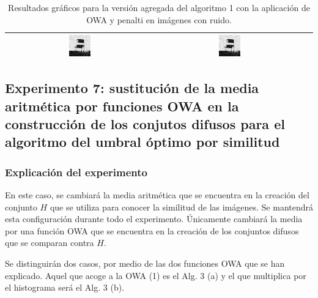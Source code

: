 \documentclass[main]{subfiles}
\begin{document}
\begin{table}
\begin{tabular}{c|c|c}
\includegraphics[width=0.15\textwidth]{img/res/e6/alg1agregadoowa2chairsp020.jpg} &
\includegraphics[width=0.15\textwidth]{img/res/e6/alg1agregadoowa3chairsp020.jpg} \\\hline
\end{tabular}
\caption{Resultados gráficos para la versión agregada del algoritmo 1 con la aplicación de OWA y penalti en imágenes con ruido.\label{tab:resultexp6imagenesruido}}
\end{table}


\subsection{Experimento 7: sustitución de la media aritmética por funciones OWA en la construcción de los conjutos difusos para el algoritmo del umbral óptimo por similitud}
\subsubsection{Explicación del experimento}
En este caso, se cambiará la media aritmética que se encuentra en la creación del conjunto $H$ que se utiliza para conocer la similitud de las imágenes. Se mantendrá esta configuración durante todo el experimento. Únicamente cambiará la media por una función OWA que se encuentra en la creación de los conjuntos difusos que se comparan contra $H$.

Se distinguirán dos casos, por medio de las dos funciones OWA que se han explicado. Aquel que acoge a la OWA (1) es el Alg. 3 (a) y el que multiplica por el histograma será el Alg. 3 (b).
\end{document}

